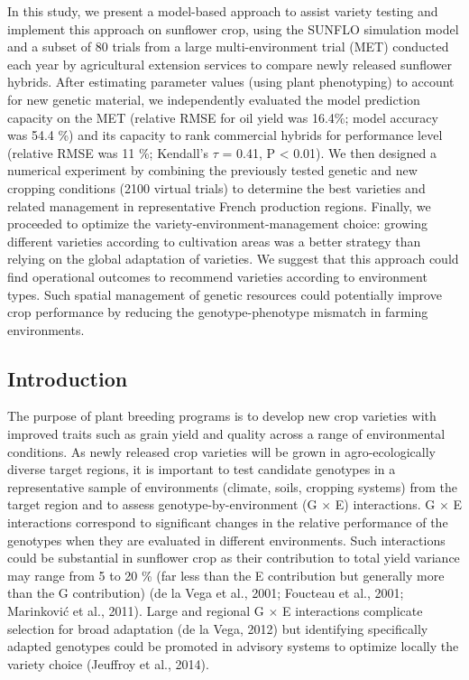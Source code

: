 \documentclass[a4paper]{article}
\begin{document}
In this study, we present a model-based approach to assist variety
testing and implement this approach on sunflower crop, using the SUNFLO
simulation model and a subset of 80 trials from a large
multi-environment trial (MET) conducted each year by agricultural
extension services to compare newly released sunflower hybrids. After
estimating parameter values (using plant phenotyping) to account for new
genetic material, we independently evaluated the model prediction
capacity on the MET (relative RMSE for oil yield was 16.4\%; model
accuracy was 54.4 \%) and its capacity to rank commercial hybrids for
performance level (relative RMSE was 11 \%; Kendall's \(\tau\) = 0.41, P
\textless{} 0.01). We then designed a numerical experiment by combining
the previously tested genetic and new cropping conditions (2100 virtual
trials) to determine the best varieties and related management in
representative French production regions. Finally, we proceeded to
optimize the variety-environment-management choice: growing different
varieties according to cultivation areas was a better strategy than
relying on the global adaptation of varieties. We suggest that this
approach could find operational outcomes to recommend varieties
according to environment types. Such spatial management of genetic
resources could potentially improve crop performance by reducing the
genotype-phenotype mismatch in farming environments.

\newpage

\subsection{Introduction}\label{introduction}

The purpose of plant breeding programs is to develop new crop varieties
with improved traits such as grain yield and quality across a range of
environmental conditions. As newly released crop varieties will be grown
in agro-ecologically diverse target regions, it is important to test
candidate genotypes in a representative sample of environments (climate,
soils, cropping systems) from the target region and to assess
genotype-by-environment (G \(\times\) E) interactions. G \(\times\) E
interactions correspond to significant changes in the relative
performance of the genotypes when they are evaluated in different
environments. Such interactions could be substantial in sunflower crop
as their contribution to total yield variance may range from 5 to 20 \%
(far less than the E contribution but generally more than the G
contribution) (de la Vega et al., 2001; Foucteau et al., 2001;
Marinković et al., 2011). Large and regional G \(\times\) E interactions
complicate selection for broad adaptation (de la Vega, 2012) but
identifying specifically adapted genotypes could be promoted in advisory
systems to optimize locally the variety choice (Jeuffroy et al., 2014).
\end{document}
